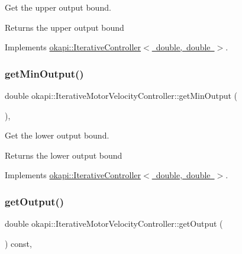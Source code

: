 Get the upper output bound.

\begin{DoxyReturn}{Returns}
the upper output bound 
\end{DoxyReturn}


Implements \mbox{\hyperlink{classokapi_1_1IterativeController_a09bdba3a6d7854d943ed5401210b0595}{okapi\+::\+Iterative\+Controller$<$ double, double $>$}}.

\mbox{\label{classokapi_1_1IterativeMotorVelocityController_a32942ed7359481ede1fba86d7dc44795}} 
\subsubsection{\texorpdfstring{getMinOutput()}{getMinOutput()}}
{\footnotesize\ttfamily double okapi\+::\+Iterative\+Motor\+Velocity\+Controller\+::get\+Min\+Output (\begin{DoxyParamCaption}{ }\end{DoxyParamCaption})\hspace{0.3cm}{\ttfamily [override]}, {\ttfamily [virtual]}}

Get the lower output bound.

\begin{DoxyReturn}{Returns}
the lower output bound 
\end{DoxyReturn}


Implements \mbox{\hyperlink{classokapi_1_1IterativeController_a4d271df97caeedbcc807b714a48eaa30}{okapi\+::\+Iterative\+Controller$<$ double, double $>$}}.

\mbox{\label{classokapi_1_1IterativeMotorVelocityController_a078d0d0d20118e374d01d2b9eba23da3}} 
\subsubsection{\texorpdfstring{getOutput()}{getOutput()}}
{\footnotesize\ttfamily double okapi\+::\+Iterative\+Motor\+Velocity\+Controller\+::get\+Output (\begin{DoxyParamCaption}{ }\end{DoxyParamCaption}) const\hspace{0.3cm}{\ttfamily [override]}, {\ttfamily [virtual]}}


